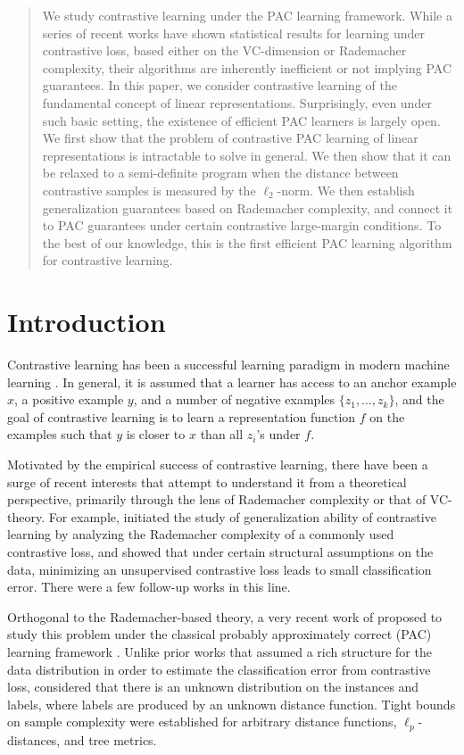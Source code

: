 \begin{abstract}
We study contrastive learning under the PAC learning framework. While a series of recent works have shown statistical results for learning under contrastive loss, based either on the VC-dimension or Rademacher complexity, their algorithms are inherently inefficient or not implying PAC guarantees. In this paper, we consider contrastive learning of the fundamental concept of linear representations. Surprisingly, even under such basic setting, the existence of efficient PAC learners is largely open. We first show that the problem of contrastive PAC learning of linear representations is intractable to solve in general. We then show that it can be relaxed to a semi-definite program when the distance between contrastive samples is measured by the $\ell_2$-norm. We then establish generalization guarantees based on Rademacher complexity, and connect it to PAC guarantees under certain contrastive large-margin conditions. To the best of our knowledge, this is the first efficient PAC learning algorithm for contrastive learning.
\end{abstract}


\section{Introduction}

Contrastive learning has been a successful learning paradigm in modern machine learning \cite{GH10contrastive,LL18}. In general, it is assumed that a learner has access to an anchor example $x$, a positive example $y$, and a number of negative examples $\{z_1, \dots, z_k\}$, and the goal of contrastive learning is to learn a representation function $f$ on the examples such that $y$ is closer to $x$ than all $z_i$'s under $f$.

Motivated by the empirical success of contrastive learning, there have been a surge of recent interests that attempt to understand it from a theoretical perspective, primarily through the lens of Rademacher complexity or that of VC-theory.
For example, \citet{arora2019contrastive} initiated the study of generalization ability of contrastive learning by analyzing the Rademacher complexity of a commonly used contrastive loss, and showed that under certain structural assumptions on the data, minimizing an unsupervised contrastive loss leads to small classification error. There were a few follow-up works in this line.

Orthogonal to the Rademacher-based theory, a very recent work of \citet{alon2024contrastive} proposed to study this problem under the classical probably approximately correct (PAC) learning framework \citep{valiant1984theory}. Unlike prior works that assumed a rich structure for the data distribution in order to estimate the classification error from contrastive loss, \citet{alon2024contrastive} considered that there is an unknown distribution on the instances and labels, where labels are produced by an unknown distance function. Tight bounds on sample complexity were established for arbitrary distance functions, $\ell_p$-distances, and tree metrics.


